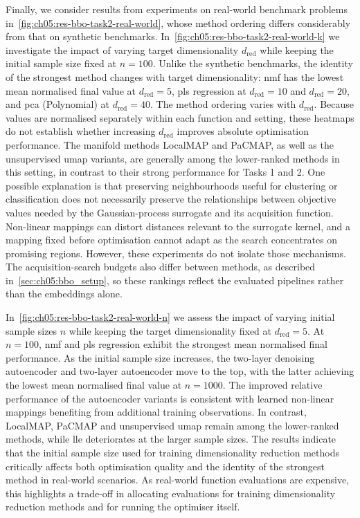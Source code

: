 Finally, we consider results from experiments on real-world benchmark problems in~\cref{fig:ch05:res-bbo-task2-real-world}, whose method ordering differs considerably from that on synthetic benchmarks.
In~\cref{fig:ch05:res-bbo-task2-real-world-k} we investigate the impact of varying target dimensionality $d_{\mathrm{red}}$ while keeping the initial sample size fixed at $n = 100$.
Unlike the synthetic benchmarks, the identity of the strongest method changes with target dimensionality: \gls{nmf} has the lowest mean normalised final value at $d_{\mathrm{red}}=5$, \gls{pls} regression at $d_{\mathrm{red}}=10$ and $d_{\mathrm{red}}=20$, and \gls{pca} (Polynomial) at $d_{\mathrm{red}}=40$.
The method ordering varies with $d_{\mathrm{red}}$. Because values are normalised separately within each function and setting, these heatmaps do not establish whether increasing $d_{\mathrm{red}}$ improves absolute optimisation performance.
The manifold methods LocalMAP and PaCMAP, as well as the unsupervised \gls{umap} variants, are generally among the lower-ranked methods in this setting, in contrast to their strong performance for Tasks 1 and 2.
One possible explanation is that preserving neighbourhoods useful for clustering or classification does not necessarily preserve the relationships between objective values needed by the Gaussian-process surrogate and its acquisition function. Non-linear mappings can distort distances relevant to the surrogate kernel, and a mapping fixed before optimisation cannot adapt as the search concentrates on promising regions. However, these experiments do not isolate those mechanisms. The acquisition-search budgets also differ between methods, as described in~\cref{sec:ch05:bbo_setup}, so these rankings reflect the evaluated pipelines rather than the embeddings alone.

In~\cref{fig:ch05:res-bbo-task2-real-world-n} we assess the impact of varying initial sample sizes $n$ while keeping the target dimensionality fixed at $d_{\mathrm{red}} = 5$.
At $n=100$, \gls{nmf} and \gls{pls} regression exhibit the strongest mean normalised final performance. As the initial sample size increases, the two-layer denoising autoencoder and two-layer autoencoder move to the top, with the latter achieving the lowest mean normalised final value at $n=1000$.
The improved relative performance of the autoencoder variants is consistent with learned non-linear mappings benefiting from additional training observations.
In contrast, LocalMAP, PaCMAP and unsupervised \gls{umap} remain among the lower-ranked methods, while \gls{lle} deteriorates at the larger sample sizes.
The results indicate that the initial sample size used for training dimensionality reduction methods critically affects both optimisation quality and the identity of the strongest method in real-world scenarios.
As real-world function evaluations are expensive, this highlights a trade-off in allocating evaluations for training dimensionality reduction methods and for running the optimiser itself.


